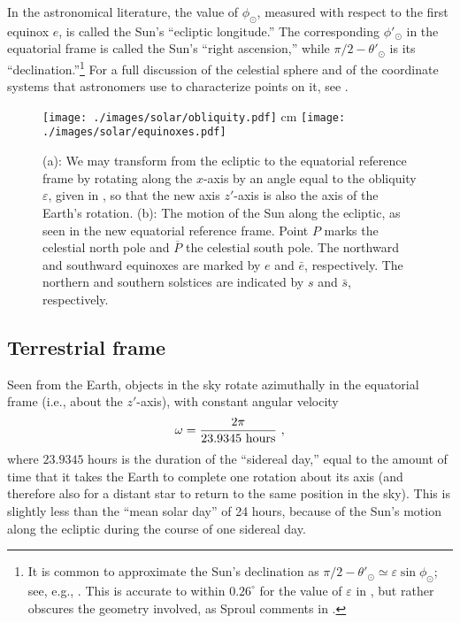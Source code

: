 In the astronomical literature, the value of $\phi_\odot$, measured with respect to the first equinox $e$, is called the Sun's ``ecliptic longitude.''  The corresponding $\phi'_\odot$ in the equatorial frame is called the Sun's ``right ascension,'' while $\pi / 2 - \theta'_\odot$ is its ``declination.''\footnote{It is common to approximate the Sun's declination as \hbox{$\pi / 2 - \theta'_\odot \simeq \varepsilon \sin \phi_\odot$}; see, e.g., \cite{Khavrus}.  This is accurate to within $0.26^\circ$ for the value of $\varepsilon$ in , but rather obscures the geometry involved, as Sproul comments in \cite{Sproul}.}  For a full discussion of the celestial sphere and of the coordinate systems that astronomers use to characterize points on it, see \cite{celestial-sphere}.

\begin{figure} [htb]
\begin{center}
	\texttt{[image: ./images/solar/obliquity.pdf]}  cm
	\texttt{[image: ./images/solar/equinoxes.pdf]}
\end{center}
\caption{\small (a): We may transform from the ecliptic to the equatorial reference frame by rotating along the $x$-axis by an angle equal to the obliquity $\varepsilon$, given in , so that the new axis $z'$-axis is also the axis of the Earth's rotation.  (b):  The motion of the Sun along the ecliptic, as seen in the new equatorial reference frame.  Point $P$ marks the celestial north pole and $\overline P$ the celestial south pole.  The northward and southward equinoxes are marked by $e$ and $\bar e$, respectively.  The northern and southern solstices are indicated by $s$ and $\bar s$, respectively.}
\end{figure}

\subsection{Terrestrial frame}

Seen from the Earth, objects in the sky rotate azimuthally in the equatorial frame (i.e., about the $z'$-axis), with constant angular velocity
\begin{equation}
\omega = \frac{2\pi}{23.9345 ~\hbox{hours}}~,
\la{eq:omega}
\end{equation}
where $23.9345$ hours is the duration of the ``sidereal day,'' equal to the amount of time that it takes the Earth to complete one rotation about its axis (and therefore also for a distant star to return to the same position in the sky).  This is slightly less than the ``mean solar day'' of 24 hours, because of the Sun's motion along the ecliptic during the course of one sidereal day.

